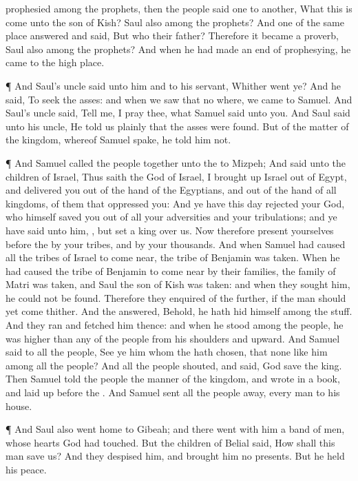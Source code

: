 {prophesied among the
prophets, then the
people
said
one to
another, What
{} this
{} is come unto the
son of
Kish?
{}
Saul also among the
prophets?
And
one of the same place
answered and
said, But who
{} their
father? Therefore it became a
proverb,
{}
Saul also among the
prophets?
And when he had made an
end of
prophesying, he
came to the high
place.
\par }{\PP {}¶ And
Saul’s
uncle
said unto him and to his
servant,
Whither
went ye? And he
said, To
seek the
asses: and when we
saw that
{} no
where, we
came to
Samuel.
And
Saul’s
uncle
said,
Tell me, I pray thee, what
Samuel
said unto you.
And
Saul
said unto his
uncle, He
told us
plainly that the
asses were
found. But of the
matter of the
kingdom, whereof
Samuel
spake, he
told him not.
\par }{\PP {}¶ And
Samuel
called the
people together unto the
{} to
Mizpeh;
And
said unto the
children of
Israel, Thus
saith the
{}
God of
Israel, I brought
up
Israel out of
Egypt, and
delivered you out of the
hand of the
Egyptians, and out of the
hand of all
kingdoms,
{} of them that
oppressed you:
And ye have this
day
rejected your
God, who himself
saved you out of all your
adversities and your
tribulations; and ye have
said unto him,
{}, but
set a
king over us. Now therefore
present yourselves
before the
{} by your
tribes, and by your
thousands.
And when
Samuel had caused all the
tribes of
Israel to come
near, the
tribe of
Benjamin was
taken.
When he had caused the
tribe of
Benjamin to come
near by their
families, the
family of
Matri was
taken, and
Saul the
son of
Kish was
taken: and when they
sought him, he could not be
found.
Therefore they
enquired of the
{} further, if the
man should yet
come
thither. And the
{}
answered, Behold, he hath
hid himself among the
stuff.
And they
ran and
fetched him thence: and when he
stood
among the
people, he was
higher than any of the
people from his
shoulders and
upward.
And
Samuel
said to all the
people,
See ye him whom the
{} hath
chosen, that
{} none like him among all the
people? And all the
people
shouted, and
said, God
save the
king.
Then
Samuel
told the
people the
manner of the
kingdom, and
wrote
{} in a
book, and laid
{}
up
before the
{}. And
Samuel
sent all the
people
away, every
man to his
house.
\par }{\PP {}¶ And
Saul also
went
home to
Gibeah; and there
went with him a band of
men, whose
hearts
God had
touched.
But the
children of
Belial
said, How shall this man
save us? And they
despised him, and
brought him no
presents. But he held his
peace.

}
